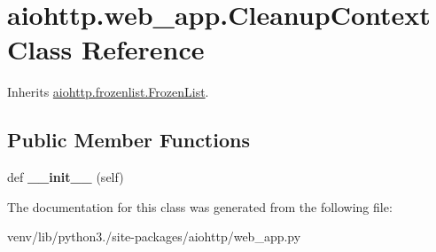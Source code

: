 \hypertarget{classaiohttp_1_1web__app_1_1_cleanup_context}{}\section{aiohttp.\+web\+\_\+app.\+Cleanup\+Context Class Reference}
\label{classaiohttp_1_1web__app_1_1_cleanup_context}


Inherits \hyperlink{classaiohttp_1_1frozenlist_1_1_frozen_list}{aiohttp.\+frozenlist.\+Frozen\+List}.

\subsection*{Public Member Functions}
\begin{DoxyCompactItemize}
\item 
\mbox{\label{classaiohttp_1_1web__app_1_1_cleanup_context_aadb6d00f234ccf6c591cc01fd6617447}} 
def {\bfseries \+\_\+\+\_\+init\+\_\+\+\_\+} (self)
\end{DoxyCompactItemize}


The documentation for this class was generated from the following file\+:\begin{DoxyCompactItemize}
\item 
venv/lib/python3./site-\/packages/aiohttp/web\+\_\+app.\+py\end{DoxyCompactItemize}
